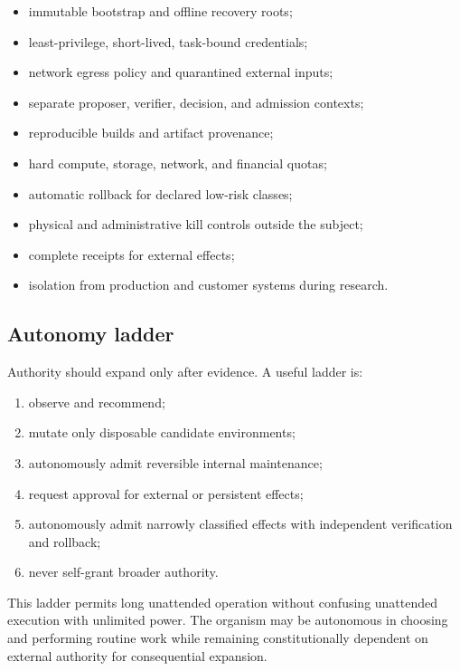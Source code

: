 \begin{itemize}[leftmargin=*]
  \item immutable bootstrap and offline recovery roots;
  \item least-privilege, short-lived, task-bound credentials;
  \item network egress policy and quarantined external inputs;
  \item separate proposer, verifier, decision, and admission contexts;
  \item reproducible builds and artifact provenance;
  \item hard compute, storage, network, and financial quotas;
  \item automatic rollback for declared low-risk classes;
  \item physical and administrative kill controls outside the subject;
  \item complete receipts for external effects;
  \item isolation from production and customer systems during research.
\end{itemize}

\subsection{Autonomy ladder}

Authority should expand only after evidence. A useful ladder is:

\begin{enumerate}[leftmargin=*]
  \item observe and recommend;
  \item mutate only disposable candidate environments;
  \item autonomously admit reversible internal maintenance;
  \item request approval for external or persistent effects;
  \item autonomously admit narrowly classified effects with independent
  verification and rollback;
  \item never self-grant broader authority.
\end{enumerate}

This ladder permits long unattended operation without confusing unattended
execution with unlimited power. The organism may be autonomous in choosing and
performing routine work while remaining constitutionally dependent on external
authority for consequential expansion.
